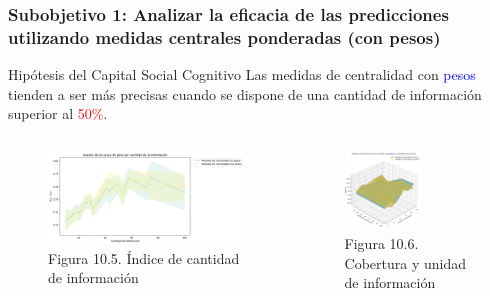 \documentclass{beamer}
\begin{document}
\begin{frame}
	\frametitle{Subobjetivo 1: Analizar la eficacia de las predicciones utilizando medidas centrales ponderadas (con pesos)}
\begin{block}{Hipótesis del Capital Social Cognitivo}
Las medidas de centralidad con \textcolor{blue}{pesos} tienden a ser más precisas cuando se dispone de una cantidad de información superior al \textcolor{red}{50\%}.
\end{block}
		\begin{columns}[c]
	\begin{column}{.5\textwidth}
		\begin{figure}
			\centering
			\includegraphics[width=1\textwidth]{figs/cap7/figura_36}
\caption{Figura 10.5. Índice de cantidad de información}
		\end{figure}      
	\end{column}
	\begin{column}{.5\textwidth}
		\begin{figure}
			\centering
			\includegraphics[width=0.6\textwidth]{figs/cap7/figura_37}
			\caption{Figura 10.6. Cobertura y unidad de información}
		\end{figure}
	\end{column}
\end{columns}
	
\end{frame}
\end{document}
